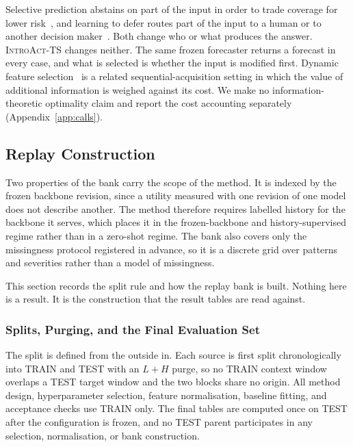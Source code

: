 \documentclass{article}
\newcommand{\introact}{\textsc{IntroAct-TS}}
\begin{document}
Selective prediction abstains on part of the input in order to trade coverage for lower
risk~\citep{chow1970optimum,vovk2005algorithmic,geifman2017selective,lei2018distribution}, and
learning to defer routes part of the input to a human or to another decision
maker~\citep{madras2018predict,mozannar2020consistent}. Both change who or what produces the
answer. \introact{} changes neither. The same frozen forecaster returns a forecast in every
case, and what is selected is whether the input is modified first. Dynamic feature
selection~\citep{he2024dime} is a related sequential-acquisition setting in which the value of
additional information is weighed against its cost. We make no information-theoretic
optimality claim and report the cost accounting separately (Appendix~\ref{app:calls}).

\subsection{Replay Construction}
\label{app:replay}
Two properties of the bank carry the scope of the method. It is indexed by the frozen backbone
revision, since a utility measured with one revision of one model does not describe another.
The method therefore requires labelled history for the backbone it serves, which places it in
the frozen-backbone and history-supervised regime rather than in a zero-shot regime. The bank also
covers only the missingness protocol registered in advance, so it is a discrete grid over
patterns and severities rather than a model of missingness.

This section records the split rule and how the replay bank is built. Nothing here is a
result. It is the construction that the result tables are read against.

\subsubsection{Splits, Purging, and the Final Evaluation Set}
\label{app:splits}
The split is defined from the outside in. Each source is first split chronologically into
TRAIN and TEST with an $L + H$ purge, so no TRAIN context window overlaps a TEST target window
and the two blocks share no origin. All method design, hyperparameter selection, feature
normalisation, baseline fitting, and acceptance checks use TRAIN only. The final tables are
computed once on TEST after the configuration is frozen, and no TEST parent participates in
any selection, normalisation, or bank construction.
\end{document}
